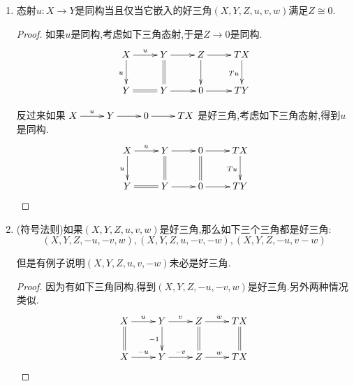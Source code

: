 \begin{enumerate}
\begin{proof}
    	2推1,如果存在$u'$使得$u'u=1_X$,那么有如下三角态射.所以有$w=0$.类似得到3推1.
    	$$\xymatrix{X\ar[r]^u\ar@{=}[d]&Y\ar[r]^v\ar[d]_{u'}&Z\ar[r]^w\ar[d]&TX\ar@{=}[d]\\X\ar@{=}[r]&X\ar[r]&0\ar[r]&0}$$
    	
    	4推1是直接的,因为有4推2推1成立.最后证明1推4.先按照1推2得到一个$s:Y\to X$使得$su=1_X$,于是得到如下好三角的态射.我们解释过此时有$(s,v)$是同构,把逆映射记作$(a,t):X\oplus Z\to Y$.那么$s,t$满足条件.
    	$$\xymatrix{X\ar@{=}[d]\ar[r]^u&Y\ar[r]^v\ar[d]_{(s,v)}&Z\ar@{=}[d]\ar[r]^0&TX\ar@{=}[d]\\X\ar[r]^{(1,0)}&X\oplus Z\ar[r]^{p_Z}&Z\ar[r]^0&TX}$$
    \end{proof}
    \item 态射$u:X\to Y$是同构当且仅当它嵌入的好三角$(X,Y,Z,u,v,w)$满足$Z\cong0$.
    \begin{proof}
    	
    	如果$u$是同构,考虑如下三角态射,于是$Z\to0$是同构.
    	$$\xymatrix{X\ar[r]^u\ar[d]_u&Y\ar[r]\ar@{=}[d]&Z\ar[r]\ar[d]&TX\ar[d]_{Tu}\\Y\ar@{=}[r]&Y\ar[r]&0\ar[r]&TY}$$
    	
    	反过来如果$\xymatrix{X\ar[r]^u&Y\ar[r]&0\ar[r]&TX}$是好三角,考虑如下三角态射,得到$u$是同构.
    	$$\xymatrix{X\ar[r]^u\ar[d]_u&Y\ar[r]\ar@{=}[d]&0\ar[r]\ar@{=}[d]&TX\ar[d]_{Tu}\\Y\ar@{=}[r]&Y\ar[r]&0\ar[r]&TY}$$
    \end{proof}
    \item (符号法则)如果$(X,Y,Z,u,v,w)$是好三角,那么如下三个三角都是好三角:
    $$(X,Y,Z,-u,-v,w),(X,Y,Z,u,-v,-w),(X,Y,Z,-u,v-w)$$
    
    但是有例子说明$(X,Y,Z,u,v,-w)$未必是好三角.
    \begin{proof}
    	
    	因为有如下三角同构,得到$(X,Y,Z,-u,-v,w)$是好三角.另外两种情况类似.
    	$$\xymatrix{X\ar[r]^u\ar@{=}[d]&Y\ar[r]^v\ar[d]_{-1}&Z\ar[r]^w\ar@{=}[d]&TX\ar@{=}[d]\\X\ar[r]^{-u}&Y\ar[r]^{-v}&Z\ar[r]^w&TX}$$
    \end{proof}
\end{enumerate}

